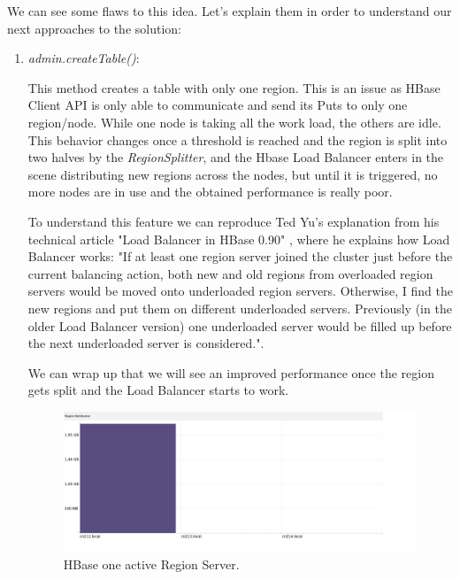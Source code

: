 \bigskip


\par

We can see some flaws to this idea. Let's explain them in order to understand our next approaches to the solution:

\begin{enumerate}
\item \textit{admin.createTable()}:
\par
This method creates a table with only one region. This is an issue as HBase Client API is only able to communicate and send its Puts to only one region/node. While one node is taking all the work load, the others are idle. This behavior changes once a threshold is reached and the region is split into two halves by the \textit{RegionSplitter}, and the Hbase Load Balancer enters in the scene distributing new regions across the nodes, but until it is triggered, no more nodes are in use and the obtained performance is really poor.
\par

To understand this feature we can reproduce Ted Yu's explanation from his technical article "Load Balancer in HBase 0.90" \cite{LoadBalancer}, where he explains how Load Balancer works: "If at least one region server joined the cluster just before the current balancing action, both new and old regions from overloaded region servers would be moved onto underloaded region servers. Otherwise, I find the new regions and put them on different underloaded servers. Previously (in the older Load Balancer version) one underloaded server would be filled up before the next underloaded server is considered.".
\par
We can wrap up that we will see an improved performance once the region gets split and the Load Balancer starts to work.



\bigskip
\begin{figure}[htb]
\centering
\hspace*{0.1in}
\includegraphics[width=1.1\textwidth,height=0.41\textheight]{./images/1regionserveractive1.png}
\caption{HBase one active Region Server.} \label{fig:1regionserveractive}
\end{figure}



\end{enumerate}
